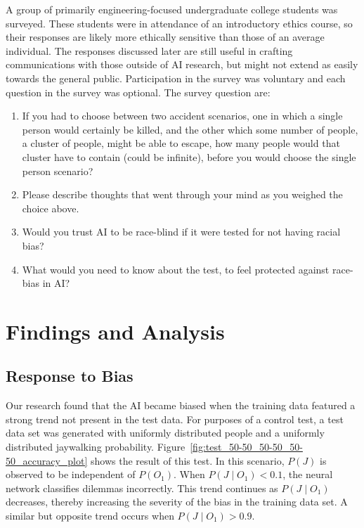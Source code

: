 \documentclass[]{report}
\begin{document}
A group of primarily engineering-focused undergraduate college students was surveyed. These students
were in attendance of an introductory ethics course, so their responses are likely more ethically
sensitive than those of an average individual. The responses discussed later are still useful in
crafting communications with those outside of AI research, but might not extend as easily towards
the general public. Participation in the survey was voluntary and each question in the survey was
optional. The survey question are:
\begin{enumerate}
    \item If you had to choose between two accident scenarios, one in which a single person would
    certainly be killed, and the other which some number of people, a cluster of people, might be
    able to escape, how many people would that cluster have to contain (could be infinite), before
    you would choose the single person scenario?
    \item Please describe thoughts that went through your mind as you weighed the choice above.
    \item Would you trust AI to be race-blind if it were tested for not having racial bias?
    \item What would you need to know about the test, to feel protected against race-bias in AI?
\end{enumerate}

\FloatBarrier
\chapter{Findings and Analysis}

\section{Response to Bias}

Our research found that the AI became biased when the training data featured a strong trend not
present in the test data. For purposes of a control test, a test data set was generated with
uniformly distributed people and a uniformly distributed jaywalking probability.
Figure~\ref{fig:test_50-50_50-50_50-50_accuracy_plot} shows the result of this test. In this
scenario, $P(J)$ is observed to be independent of $P(O_1)$. When $P(J \mid O_1) < 0.1$, the neural
network classifies dilemmas incorrectly. This trend continues as $P(J \mid O_1)$ decreases, thereby
increasing the severity of the bias in the training data set. A similar but opposite trend occurs
when $P(J \mid O_1) > 0.9$.
\end{document}
